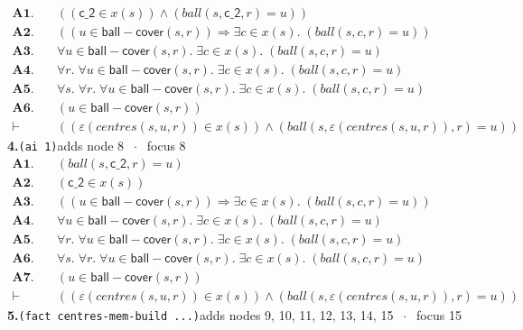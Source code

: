 \documentclass[11pt]{article}
\begin{document}
\begin{align*}
  \mathbf{A1.}\quad & ((\mathsf{c\_2} \in x(s)) \wedge (\mathit{ball}(s, \mathsf{c\_2}, r) = u)) \\
  \mathbf{A2.}\quad & ((u \in \mathsf{ball{-}cover}(s, r)) \Rightarrow \exists c \in x(s).\; (\mathit{ball}(s, c, r) = u)) \\
  \mathbf{A3.}\quad & \forall u \in \mathsf{ball{-}cover}(s, r).\; \exists c \in x(s).\; (\mathit{ball}(s, c, r) = u) \\
  \mathbf{A4.}\quad & \forall r.\; \forall u \in \mathsf{ball{-}cover}(s, r).\; \exists c \in x(s).\; (\mathit{ball}(s, c, r) = u) \\
  \mathbf{A5.}\quad & \forall s.\; \forall r.\; \forall u \in \mathsf{ball{-}cover}(s, r).\; \exists c \in x(s).\; (\mathit{ball}(s, c, r) = u) \\
  \mathbf{A6.}\quad & (u \in \mathsf{ball{-}cover}(s, r)) \\
  \vdash\quad & ((\varepsilon(\mathit{centres}(s, u, r)) \in x(s)) \wedge (\mathit{ball}(s, \varepsilon(\mathit{centres}(s, u, r)), r) = u))
\end{align*}
\medskip\noindent\textbf{4.}\quad \texttt{(ai 1)}\hfill{\small adds node 8 $\;\cdot\;$ focus 8}\\[2pt]
\begin{align*}
  \mathbf{A1.}\quad & (\mathit{ball}(s, \mathsf{c\_2}, r) = u) \\
  \mathbf{A2.}\quad & (\mathsf{c\_2} \in x(s)) \\
  \mathbf{A3.}\quad & ((u \in \mathsf{ball{-}cover}(s, r)) \Rightarrow \exists c \in x(s).\; (\mathit{ball}(s, c, r) = u)) \\
  \mathbf{A4.}\quad & \forall u \in \mathsf{ball{-}cover}(s, r).\; \exists c \in x(s).\; (\mathit{ball}(s, c, r) = u) \\
  \mathbf{A5.}\quad & \forall r.\; \forall u \in \mathsf{ball{-}cover}(s, r).\; \exists c \in x(s).\; (\mathit{ball}(s, c, r) = u) \\
  \mathbf{A6.}\quad & \forall s.\; \forall r.\; \forall u \in \mathsf{ball{-}cover}(s, r).\; \exists c \in x(s).\; (\mathit{ball}(s, c, r) = u) \\
  \mathbf{A7.}\quad & (u \in \mathsf{ball{-}cover}(s, r)) \\
  \vdash\quad & ((\varepsilon(\mathit{centres}(s, u, r)) \in x(s)) \wedge (\mathit{ball}(s, \varepsilon(\mathit{centres}(s, u, r)), r) = u))
\end{align*}
\medskip\noindent\textbf{5.}\quad \texttt{(fact centres-mem-build ...)}\hfill{\small adds nodes 9, 10, 11, 12, 13, 14, 15 $\;\cdot\;$ focus 15}\\[2pt]
\end{document}
